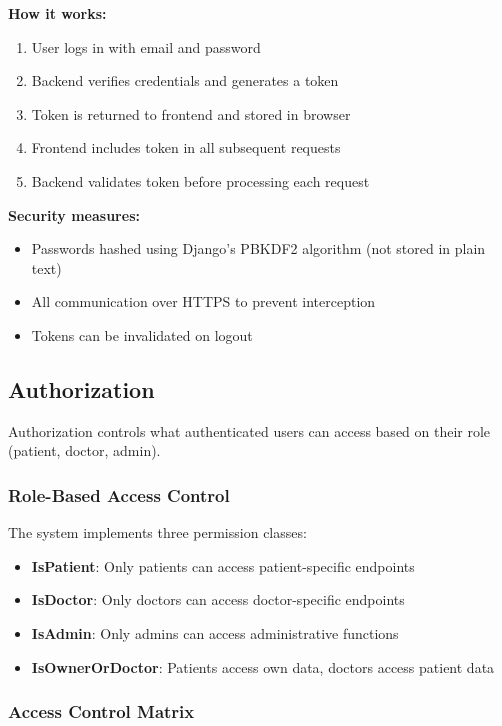 \documentclass[11pt,a4paper]{article}
\begin{document}
\noindent
\textbf{How it works:}
\begin{enumerate}
    \item User logs in with email and password
    \item Backend verifies credentials and generates a token
    \item Token is returned to frontend and stored in browser
    \item Frontend includes token in all subsequent requests
    \item Backend validates token before processing each request
\end{enumerate}
\noindent
\textbf{Security measures:}
\begin{itemize}
    \item Passwords hashed using Django's PBKDF2 algorithm (not stored in plain text)
    \item All communication over HTTPS to prevent interception
    \item Tokens can be invalidated on logout
\end{itemize}

\subsection{Authorization}

Authorization controls what authenticated users can access based on their role (patient, doctor, admin).

\subsubsection{Role-Based Access Control}

The system implements three permission classes:
\begin{itemize}
    \item \textbf{IsPatient}: Only patients can access patient-specific endpoints
    \item \textbf{IsDoctor}: Only doctors can access doctor-specific endpoints
    \item \textbf{IsAdmin}: Only admins can access administrative functions
    \item \textbf{IsOwnerOrDoctor}: Patients access own data, doctors access patient data
\end{itemize}

\subsubsection{Access Control Matrix}
\end{document}
